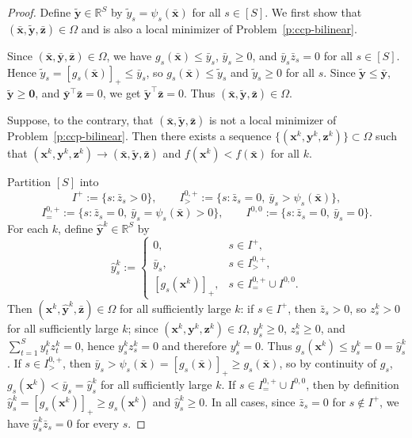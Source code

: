 \documentclass[11pt]{article}
\def\bs{\boldsymbol}
\def\Re{\mathbb{R}}
\begin{document}
\begin{proof}
Define $\tilde{\bs{y}}\in\Re^S$ by $\tilde{y}_s=\psi_s(\bar{\bs{x}})$ for all $s\in[S]$.
We first show that $(\bar{\bs{x}},\tilde{\bs{y}},\bar{\bs{z}})\in\Omega$ and is also a local minimizer of Problem~\eqref{p:ccp-bilinear}.

Since $(\bar{\bs{x}},\bar{\bs{y}},\bar{\bs{z}})\in\Omega$, we have
$g_s(\bar{\bs{x}})\le \bar{y}_s$, $\bar{y}_s\ge 0$, and $\bar{y}_s\bar{z}_s=0$ for all $s\in[S]$.
Hence $\tilde{y}_s=[g_s(\bar{\bs{x}})]_+\le \bar{y}_s$, so $g_s(\bar{\bs{x}})\le \tilde{y}_s$ and
$\tilde{y}_s\ge 0$ for all $s$. Since $\tilde{\bs{y}}\le \bar{\bs{y}}$, $\tilde{\bs{y}}\ge \bs{0}$, and
$\bar{\bs{y}}^\top\bar{\bs{z}}=0$, we get $\tilde{\bs{y}}^\top\bar{\bs{z}}=0$. Thus
$(\bar{\bs{x}},\tilde{\bs{y}},\bar{\bs{z}})\in\Omega$.

Suppose, to the contrary, that $(\bar{\bs{x}},\tilde{\bs{y}},\bar{\bs{z}})$ is not a local minimizer of
Problem~\eqref{p:ccp-bilinear}. Then there exists a sequence
$\{(\bs{x}^k,\bs{y}^k,\bs{z}^k)\}\subset\Omega$ such that
$(\bs{x}^k,\bs{y}^k,\bs{z}^k)\to(\bar{\bs{x}},\tilde{\bs{y}},\bar{\bs{z}})$ and
$f(\bs{x}^k)<f(\bar{\bs{x}})$ for all $k$.

Partition $[S]$ into
\[
I^+:=\{s:\bar{z}_s>0\},\qquad
I^{0,+}_{>} := \{s:\bar{z}_s=0,\ \bar{y}_s>\psi_s(\bar{\bs{x}})\},
\]
\[
I^{0,+}_{=} := \{s:\bar{z}_s=0,\ \bar{y}_s=\psi_s(\bar{\bs{x}})>0\},\qquad
I^{0,0}:=\{s:\bar{z}_s=0,\ \bar{y}_s=0\}.
\]
For each $k$, define $\hat{\bs{y}}^k\in\Re^S$ by
\[
\hat{y}_s^k:=
\begin{cases}
0, & s\in I^+,\\[1mm]
\bar{y}_s, & s\in I^{0,+}_{>},\\[1mm]
[g_s(\bs{x}^k)]_+, & s\in I^{0,+}_{=}\cup I^{0,0}.
\end{cases}
\]
Then $(\bs{x}^k,\hat{\bs{y}}^k,\bar{\bs{z}})\in\Omega$ for all sufficiently large $k$:
if $s\in I^+$, then $\bar z_s>0$, so $z_s^k>0$ for all sufficiently large $k$; since
$(\bs{x}^k,\bs{y}^k,\bs{z}^k)\in\Omega$, $y_s^k\ge 0$, $z_s^k\ge 0$, and
$\sum_{t=1}^S y_t^k z_t^k=0$, hence $y_s^k z_s^k=0$ and therefore $y_s^k=0$.
Thus $g_s(\bs{x}^k)\le y_s^k=0=\hat y_s^k$.
If $s\in I^{0,+}_{>}$, then $\bar y_s>\psi_s(\bar{\bs{x}})=[g_s(\bar{\bs{x}})]_+\ge g_s(\bar{\bs{x}})$,
so by continuity of $g_s$, $g_s(\bs{x}^k)<\bar y_s=\hat y_s^k$ for all sufficiently large $k$.
If $s\in I^{0,+}_{=}\cup I^{0,0}$, then by definition
$\hat y_s^k=[g_s(\bs{x}^k)]_+\ge g_s(\bs{x}^k)$ and $\hat y_s^k\ge 0$.
In all cases, since $\bar z_s=0$ for $s\notin I^+$, we have $\hat y_s^k\bar z_s=0$ for every $s$.


\end{proof}
\end{document}
